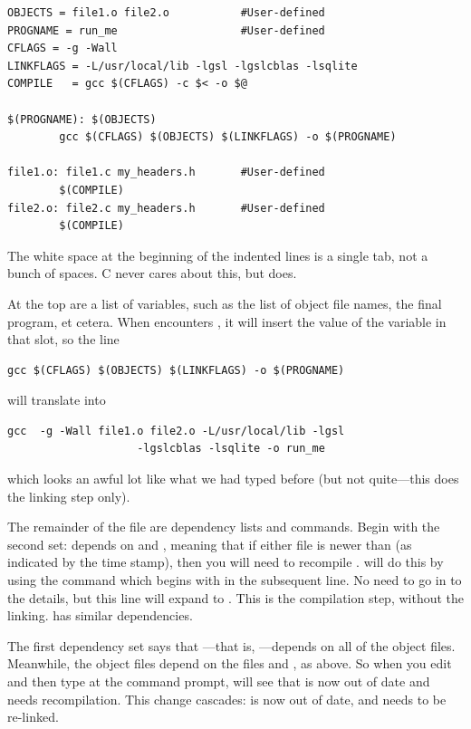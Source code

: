 \documentclass[12pt]{article}
\begin{document}
\begin{verbatim}
OBJECTS = file1.o file2.o           #User-defined
PROGNAME = run_me                   #User-defined
CFLAGS = -g -Wall
LINKFLAGS = -L/usr/local/lib -lgsl -lgslcblas -lsqlite
COMPILE   = gcc $(CFLAGS) -c $< -o $@

$(PROGNAME): $(OBJECTS)
        gcc $(CFLAGS) $(OBJECTS) $(LINKFLAGS) -o $(PROGNAME)

file1.o: file1.c my_headers.h       #User-defined
        $(COMPILE)
file2.o: file2.c my_headers.h       #User-defined
        $(COMPILE)
\end{verbatim}

The white space at the beginning of the indented lines is a single tab,
not a bunch of spaces.  C never cares about this, but 
does.

At the top are a list of variables, such as the list of object file names, the final program, et cetera.
When  encounters , it will insert the value of the variable  in that
slot, so the line 
\begin{verbatim}
gcc $(CFLAGS) $(OBJECTS) $(LINKFLAGS) -o $(PROGNAME)
\end{verbatim}
will translate into
\begin{verbatim}
gcc  -g -Wall file1.o file2.o -L/usr/local/lib -lgsl 
                    -lgslcblas -lsqlite -o run_me
\end{verbatim}
which looks an awful lot like what we had typed before (but not quite---this does the linking step only).

The remainder of the file are dependency lists and commands. Begin
with the second set:  depends on  and , meaning that if either file is newer than 
(as indicated by the time stamp), then you will need to recompile .  will do this by using the command which begins with
 in the subsequent line. No need to go in to the details, but
this line will expand to . This
is the compilation step, without the linking.  has similar
dependencies.

The first dependency set says that ---that is, ---depends on all of the object files. Meanwhile, the object files
depend on the  files and , as above. So when
you edit  and then type  at the command prompt,
 will see that  is now out of date and needs
recompilation. This change cascades:  is now out of date,
and needs to be re-linked.
\end{document}
